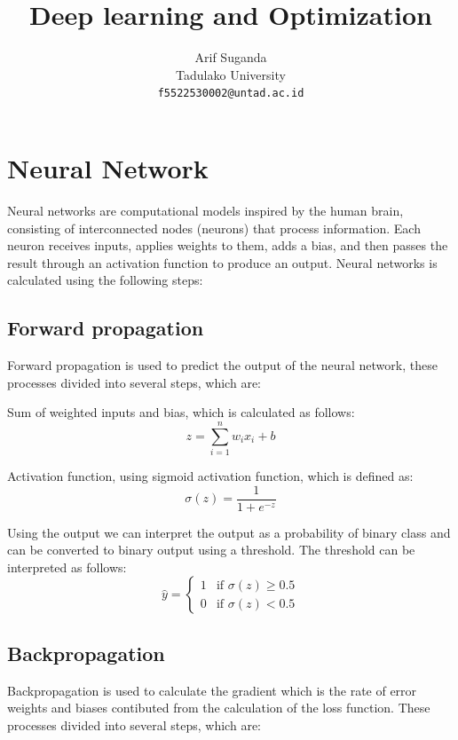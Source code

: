 \documentclass[a4paper,10pt]{article}
\title{Deep learning and Optimization}
\author{Arif Suganda\\
        Tadulako University\\
        \texttt{f5522530002@untad.ac.id}
}
\begin{document}
\maketitle

\section{Neural Network}

Neural networks are computational models inspired by the human brain, consisting of interconnected nodes (neurons) that process information. 
Each neuron receives inputs, applies weights to them, adds a bias, and then passes the result through an activation function to produce an output.
Neural networks is calculated using the following steps:

\subsection{Forward propagation}
Forward propagation is used to predict the output of the neural network, these processes divided into several steps, which are:

\noindent
Sum of weighted inputs and bias, which is calculated as follows:
\begin{equation}\label{eq:sum_weight_bias}
    z = \sum_{i=1}^{n} w_i x_i + b
\end{equation}

Activation function, using sigmoid activation function, which is defined as:
\begin{equation}\label{eq:sigmoid}
    \sigma(z) = \frac{1}{1 + e^{-z}}
\end{equation}

Using the output we can interpret the output as a probability of binary class and can be converted to binary output using a threshold.
The threshold can be interpreted as follows:
\begin{equation}\label{eq:threshold}
    \hat{y} = \begin{cases}
        1 & \text{if } \sigma(z) \ge 0.5 \\
        0 & \text{if } \sigma(z) < 0.5
    \end{cases}
\end{equation}

\subsection{Backpropagation}
Backpropagation is used to calculate the gradient which is the rate of error weights and biases contibuted from the calculation of the loss function.
These processes divided into several steps, which are:
\end{document}
